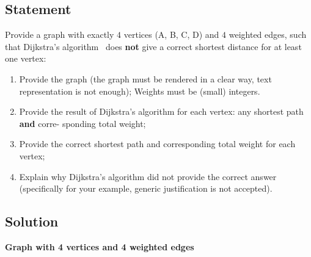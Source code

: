 \documentclass{article}
\begin{document}
\subsection{Statement}

Provide a graph with exactly \(4\) vertices (A, B, C, D) and \(4\) weighted edges, such that Dijkstra's algorithm~\cite[\S 22.3]{cormen} does \textbf{not} give a correct shortest distance for at least one vertex:
        
        \begin{enumerate}
            \item Provide the graph (the graph must be rendered in a clear way, text representation is not
                enough); Weights must be (small) integers.
                
            \item Provide the result of Dijkstra's algorithm for each vertex: any shortest path \textbf{and} corre-
                sponding total weight;
                
            \item Provide the correct shortest path and corresponding total weight for each vertex;
                
            \item Explain why Dijkstra's algorithm did not provide the correct answer (specifically for your
                example, generic justification is not accepted).
        \end{enumerate}

\subsection{Solution}

\textbf{Graph with 4 vertices and 4 weighted edges}

\begin{center}
\end{center}
\end{document}
